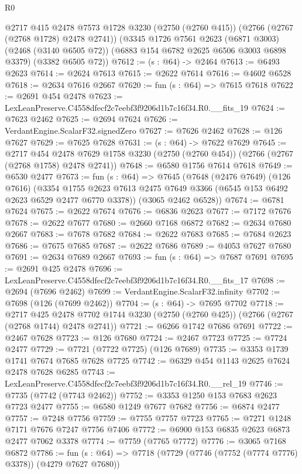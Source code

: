 \begin{lexlean}{R0}
\begin{coremodule}
  @2717
    @415
    @2478
    @7573
    @1728
    @3230
    (@2750 (@2760 @415))
    (@2766 (@2767 (@2768 @1728) @2478 @2741))
    (@3345
      @1726
      @7561
      @2623
      (@6871 @3003)
      (@2468 (@3140 @6505 @72))
      (@6883 @154 @6782 @2625 @6506 @3003 @6898 @3379)
      (@3382 @6505 @72))
@7612 := (s : @64) -> @2464
@7613 := @6493 @2623
@7614 := @2624 @7613
@7615 := @2622 @7614
@7616 := @4602 @6528
@7618 := @2634 @7616 @2667
@7620 := fun (s : @64) => @7615 @7618
@7622 := @2691 @454 @2478
@7623 := LexLeanPreserve.C4558dfecf2c7eebf3f9206d1b7c16f34.R0.__fits_19
@7624 := @7623 @2462
@7625 := @2694 @7624
@7626 := VerdantEngine.ScalarF32.signedZero
@7627 := @7626 @2462
@7628 := @126 @7627
@7629 := @7625 @7628
@7631 := (s : @64) -> @7622 @7629
@7645 := @2717
    @454
    @2478
    @7629
    @1758
    @3230
    (@2750 (@2760 @454))
    (@2766 (@2767 (@2768 @1758) @2478 @2741))
@7648 := @6580 @1756 @7614 @7618
@7649 := @6530 @2477
@7673 := fun (s : @64) =>
  @7645
    (@7648
      (@2476 @7649)
      (@126 @7616)
      (@3354 @1755 @2623 @7613 @2475 @7649 @3366 (@6545 @153 @6492 @2623 @6529 @2477 @6770 @3378))
      (@3065 @2462 @6528))
@7674 := @6781 @7624
@7675 := @2622 @7674
@7676 := @6836 @2623
@7677 := @7172 @7676
@7678 := @2622 @7677
@7680 := @2660 @7168 @6872
@7682 := @2634 @7680 @2667
@7683 := @7678 @7682
@7684 := @2622 @7683
@7685 := @7684 @2623
@7686 := @7675 @7685
@7687 := @2622 @7686
@7689 := @4053 @7627 @7680
@7691 := @2634 @7689 @2667
@7693 := fun (s : @64) => @7687 @7691
@7695 := @2691 @425 @2478
@7696 := LexLeanPreserve.C4558dfecf2c7eebf3f9206d1b7c16f34.R0.__fits_17
@7698 := @2694 (@7696 @2462)
@7699 := VerdantEngine.ScalarF32.infinity
@7702 := @7698 (@126 (@7699 @2462))
@7704 := (s : @64) -> @7695 @7702
@7718 := @2717
    @425
    @2478
    @7702
    @1744
    @3230
    (@2750 (@2760 @425))
    (@2766 (@2767 (@2768 @1744) @2478 @2741))
@7721 := @6266 @1742 @7686 @7691
@7722 := @2467 @7628
@7723 := @126 @7680
@7724 := @2467 @7723
@7725 := @7724 @2477
@7729 := @7721 (@7722 @7725) (@126 @7689)
@7735 := @3353 @1739 @1741 @7674 @7685 @7628 @7725
@7742 := @6329 @454 @1143 @2625 @7624 @2478 @7628 @6285
@7743 := LexLeanPreserve.C4558dfecf2c7eebf3f9206d1b7c16f34.R0.__rel_19
@7746 := @7735 (@7742 (@7743 @2462))
@7752 := @3353 @1250 @153 @7683 @2623 @7723 @2477
@7755 := @6580 @1249 @7677 @7682
@7756 := @6874 @2477
@7757 := @7248 @7756
@7759 := @7755 @7757 @7723
@7765 := @7271 @1248 @7171 @7676 @7247 @7756 @7406
@7772 := @6900 @153 @6835 @2623 @6873 @2477 @7062 @3378
@7774 := @7759 (@7765 @7772)
@7776 := @3065 @7168 @6872
@7786 := fun (s : @64) => @7718 (@7729 (@7746 (@7752 (@7774 @7776) @3378)) (@4279 @7627 @7680))

\end{coremodule}
\end{lexlean}

